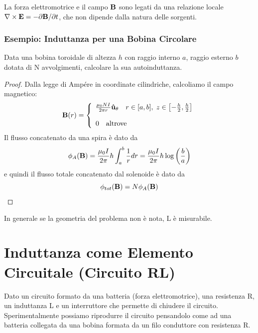 \begin{remark}
	La forza elettromotrice e il campo $\bold{B}$ sono legati da una relazione locale $\nabla \times \bold{E} = - \partial \bold{B}/\partial t$, che non dipende dalla natura delle sorgenti.
\end{remark}

\subsubsection{Esempio: Induttanza per una Bobina Circolare}

Data una bobina toroidale di altezza $h$ con raggio interno $a$, raggio esterno $b$ dotata di N avvolgimenti, calcolare la sua autoinduttanza.

\begin{proof}
	Dalla legge di Amp\'ere in coordinate cilindriche, calcoliamo il campo magnetico:
	\begin{align*}
		\bold{B}(r) = \left \{ \begin{array}{l}
			\frac{\mu_0 N I}{2 \pi r}\bold{\hat{u}}_{\theta} \quad r \in [a,b], \; z\in \left[-\frac{h}{2},\frac{h}{2} \right] \\ \rule{0pt}{20pt}
			0 \quad \text{altrove}
		\end{array}\right.
	\end{align*}
Il flusso concatenato da una spira \`e dato da 
\begin{equation*}
	\phi_{A}(\bold{B}) = \frac{\mu_0I}{2 \pi}h \int_{a}^{b} \frac{1}{r}dr = \frac{\mu_0  I}{2 \pi}h \log\left(\frac{b}{a}\right)
\end{equation*}	
e quindi il flusso totale concatenato dal solenoide \`e dato da 
\begin{equation*}
	\phi_{tot}(\bold{B}) = N \phi_{A}(\bold{B})
\end{equation*}

\end{proof} 

In generale se la geometria del problema non \`e nota, L \`e misurabile.

\section{Induttanza come Elemento Circuitale (Circuito RL)}


Dato un circuito formato da una batteria (forza elettromotrice), una resistenza R, un induttanza L e un interruttore che permette di chiudere il circuito. Sperimentalmente possiamo riprodurre il circuito pensandolo come ad una batteria collegata da una bobina formata da un filo conduttore con resistenza R.
\newline

